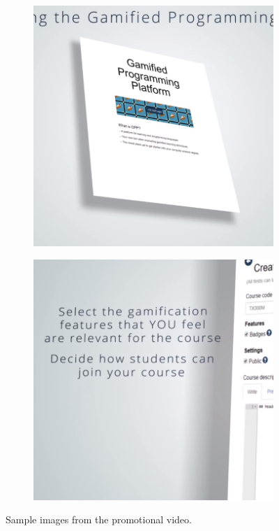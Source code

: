 \begin{figure}[ht]
\begin{subfigure}{.3\linewidth}
    \includegraphics[width=\linewidth]{img/video_2.png}
    \end{subfigure}
    \hfill
    \begin{subfigure}{.3\linewidth}
    \centering
    \includegraphics[width=\linewidth]{img/video_3.png}
    \end{subfigure}

    \caption{Sample images from the promotional video.}
\end{figure}

